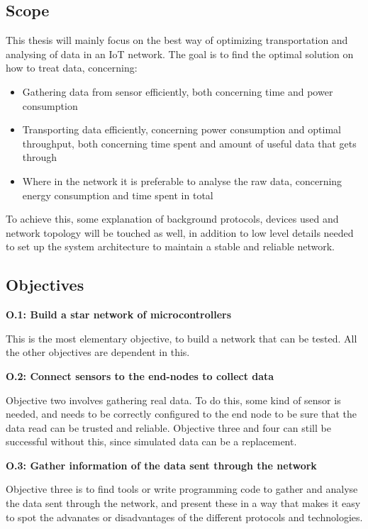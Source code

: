 \subsection{Scope}

This thesis will mainly focus on the best way of optimizing transportation and analysing of data in an IoT network. The goal is to find the optimal solution on how to treat data, concerning:

\begin{itemize}
	\item Gathering data from sensor efficiently, both concerning time and power consumption
	\item Transporting data efficiently, concerning power consumption and optimal throughput, both concerning time spent and amount of useful data that gets through
	\item Where in the network it is preferable to analyse the raw data, concerning energy consumption and time spent in total
\end{itemize}

To achieve this, some explanation of background protocols, devices used and network topology will be touched as well, in addition to low level details needed to set up the system architecture to maintain a stable and reliable network. 


\subsection{Objectives}

\noindent \textbf{O.1: Build a star network of microcontrollers}

This is the most elementary objective, to build a network that can be tested. All the other objectives are dependent in this.  

\noindent\textbf{O.2: Connect sensors to the end-nodes to collect data}

Objective two involves gathering real data. To do this, some kind of sensor is needed, and needs to be correctly configured to the end node to be sure that the data read can be trusted and reliable. Objective three and four can still be successful without this, since simulated data can be a replacement.  

\noindent\textbf{O.3: Gather information of the data sent through the network}

Objective three is to find tools or write programming code to gather and analyse the data sent through the network, and present these in a way that makes it easy to spot the advanates or disadvantages of the different protocols and technologies. 

